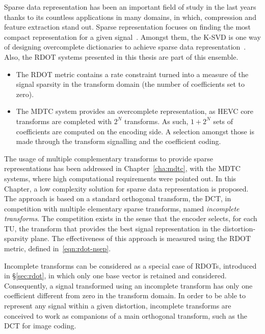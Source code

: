 \documentclass[11pt,a4paper,openright,twoside]{book}
\numberwithin{equation}{section} %
\numberwithin{figure}{section} %
\numberwithin{table}{section} %
\begin{document}
Sparse data representation has been an important field of study in the last
years thanks to its countless applications in many domains, in which,
compression and feature extraction stand out.
Sparse representation focuses on finding the most compact representation for a
given signal~\cite{huang-06-sparse-representation}.
Amongst them, the K-\acs{SVD} is one way of designing overcomplete
dictionaries to achieve sparse data
representation~\cite{aharon-06-overcomplete-sparse-dict}.
Also, the \ac{RDOT} systems presented in this thesis are part of this
ensemble.
\begin{itemize}
	\item The \ac{RDOT} metric contains a rate constraint turned into a
		measure of the signal sparsity in the transform domain (the number of
		coefficients set to zero).
	\item The \ac{MDTC} system provides an overcomplete representation, as
		\ac{HEVC} core transforms are completed with $2^N$ transforms.
		As such, $1+2^N$ sets of coefficients are computed on the encoding
		side.
		A selection amongst those is made through the transform signalling and
		the coefficient coding.
\end{itemize}

The usage of multiple complementary transforms to provide sparse
representations has been addressed in Chapter~\ref{cha:mdtc}, with the
\ac{MDTC} systems, where high computational requirements were pointed out.
In this Chapter, a low complexity solution for sparse data representation is
proposed.
The approach is based on a standard orthogonal transform, the \acf{DCT}, in
competition with multiple elementary sparse transforms, named \emph{incomplete
transforms}.
The competition exists in the sense that the encoder selects, for each
\ac{TU}, the transform that provides the best signal representation in the
distortion-sparsity plane.
The effectiveness of this approach is measured using the \ac{RDOT} metric,
defined in~\ref{eqn:rdot-nsep}.

Incomplete transforms can be considered as a special case of \acfp{RDOT},
introduced in \S\ref{sec:rdot}, in which
only one base vector is retained and considered.
Consequently, a signal transformed using an incomplete transform has only one
coefficient different from zero in the transform domain.
In order to be able to represent any signal within a given distortion,
incomplete transforms are conceived to work as companions of a main orthogonal
transform, such as the \ac{DCT} for image coding.
\end{document}

